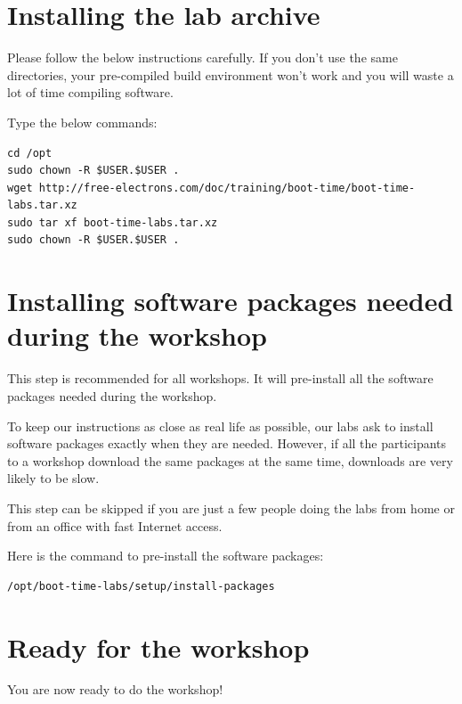 \section{Installing the lab archive}

Please follow the below instructions carefully. If you don't use the
same directories, your pre-compiled build environment won't work and
you will waste a lot of time compiling software.

Type the below commands:
\begin{verbatim}
cd /opt
sudo chown -R $USER.$USER .
wget http://free-electrons.com/doc/training/boot-time/boot-time-labs.tar.xz
sudo tar xf boot-time-labs.tar.xz
sudo chown -R $USER.$USER .
\end{verbatim}

\section{Installing software packages needed during the workshop}

This step is recommended for all workshops. It will pre-install all the
software packages needed during the workshop.

To keep our instructions as close as real life as possible, our labs
ask to install software packages exactly when they are needed. However,
if all the participants to a workshop download the same packages at the
same time, downloads are very likely to be slow.

This step can be skipped if you are just a few people doing the labs
from home or from an office with fast Internet access.

Here is the command to pre-install the software packages:

\begin{verbatim}
/opt/boot-time-labs/setup/install-packages
\end{verbatim}

\section{Ready for the workshop}

You are now ready to do the workshop!
